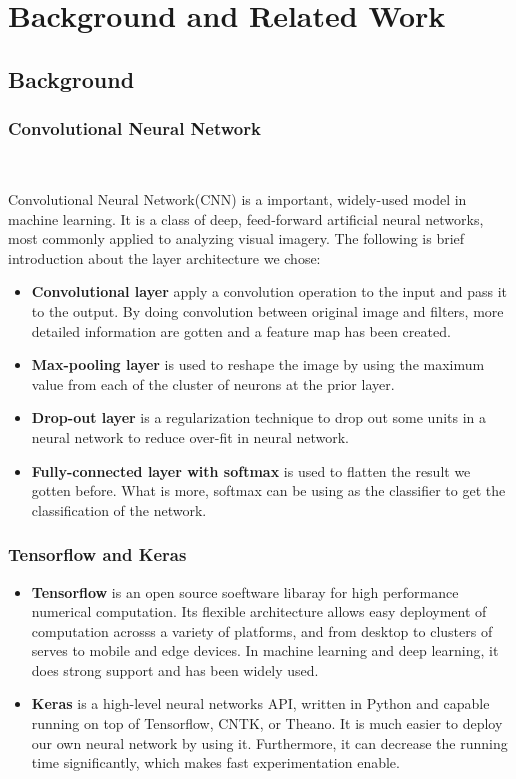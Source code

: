 \documentclass[conference]{IEEEtran}
\begin{document}
\section{Background and Related Work}

\subsection{Background}

\subsubsection{Convolutional Neural Network}

\

\noindent
Convolutional Neural Network(CNN) is a important, widely-used model in machine learning. It is a class of deep, feed-forward artificial neural networks, most commonly applied to analyzing visual imagery. The following is brief introduction about the layer architecture we chose: 
\begin{itemize}
\item \textbf{Convolutional layer} apply a convolution operation to the input and pass it to the output. By doing convolution between original image and filters, more detailed information are gotten and a feature map has been created.
\item\textbf{Max-pooling layer} is used to reshape the image by using the maximum value from each of the cluster of neurons at the prior layer.
\item\textbf{Drop-out layer} is a regularization technique to drop out some units in a neural network to reduce over-fit in neural network.
\item\textbf{Fully-connected layer with softmax} is used to flatten the result we gotten before. What is more, softmax can be using as the classifier to get the classification of the network.
\end{itemize}


\subsubsection{Tensorflow and Keras}

\noindent
\begin{itemize}
\item\textbf{Tensorflow} is an open source soeftware libaray for high performance numerical computation. Its flexible architecture allows easy deployment of computation acrosss a variety of platforms, and from desktop to clusters of serves to mobile and edge devices. In machine learning and deep learning, it does strong support and has been widely used.

\item\textbf{Keras} is a high-level neural networks API, written in Python and capable running on top of Tensorflow, CNTK, or Theano. It is much easier to deploy our own neural network by using it. Furthermore, it can decrease the running time significantly, which makes fast experimentation enable. 
\end{itemize}
\end{document}
